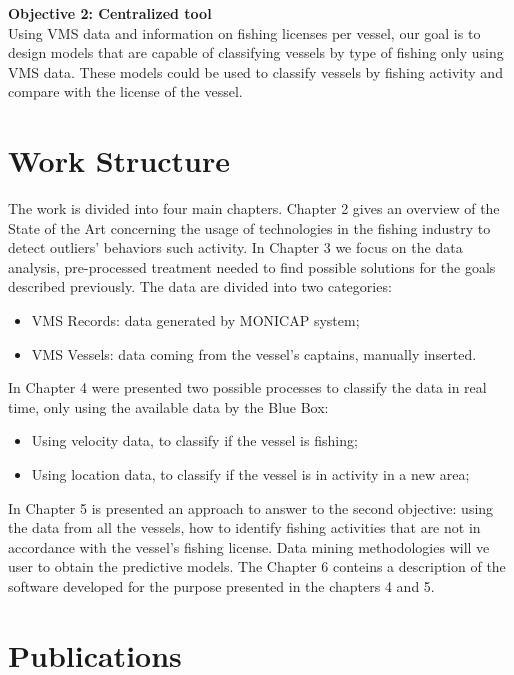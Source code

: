  \textbf{Objective 2: Centralized tool} \\
Using VMS data and information on fishing licenses per vessel, our goal is to design models that are capable of classifying vessels by type of fishing only using VMS data. These models could be used to classify vessels by fishing activity and compare with the license of the vessel. 


\section{Work Structure} %
\label{sec:work_structure}
The work is divided into four main chapters. Chapter 2 gives an overview of the State of the Art concerning the usage of technologies in the fishing industry to detect outliers’ behaviors such activity. In Chapter 3 we focus on the data analysis, pre-processed treatment needed to find possible solutions for the goals described previously. The data are divided into two categories:
\begin{itemize}
\item VMS Records: data generated by MONICAP system;
\item VMS Vessels: data coming from the vessel’s captains, manually inserted.
\end{itemize}
In Chapter 4 were presented two possible processes to classify the data in real time, only using the available data by the Blue Box:
\begin{itemize}
\item	Using velocity data, to classify if the vessel is fishing;
\item	Using location data, to classify if the vessel is in activity in a new area;
\end{itemize}
In Chapter 5 is presented an approach to answer to the second objective: using the data from all the vessels, how to identify fishing activities that are not in accordance with the vessel’s fishing license. Data mining methodologies will ve user to obtain the predictive models.
The Chapter 6 conteins a description of the software developed for the purpose presented in the chapters 4 and 5.


\section{Publications} %
\label{sec:publications}

